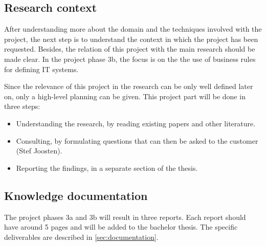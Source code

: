 \subsection{Research context}
%
After understanding more about the domain and the techniques involved with the project, the next step is to understand the context in which the project has been requested.
Besides, the relation of this project with the main research should be made clear.
In the project phase 3b, the focus is on the the use of business rules for defining IT systems.

Since the relevance of this project in the research can be only well defined later on, only a high-level planning can be given.
This project part will be done in three steps:
\begin{itemize}
	\item Understanding the research, by reading existing papers and other literature.
	\item Consulting, by formulating questions that can then be asked to the customer (Stef Joosten).
	\item Reporting the findings, in a separate section of the thesis.
\end{itemize}

\subsection{Knowledge documentation}
The project phases 3a and 3b will result in three reports.
Each report should have around 5 pages and will be added to the bachelor thesis.
The specific deliverables are described in \autoref{sec:documentation}.

